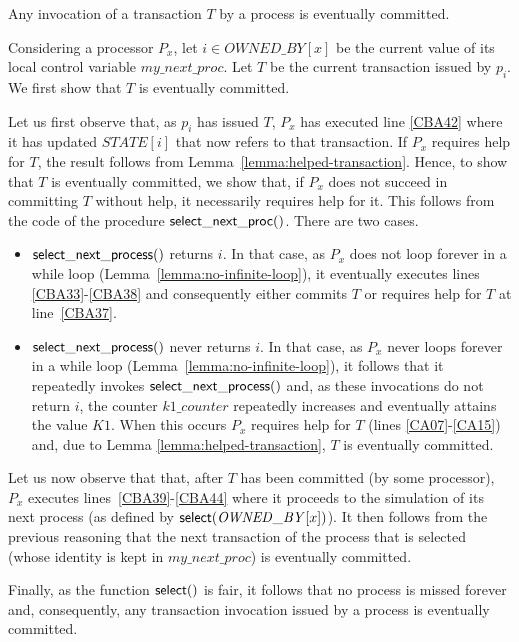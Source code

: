\begin{lemma}
\label{lemma:transactions-are-committed}
Any invocation of a transaction $T$ by a process  is eventually committed.
\end{lemma}

\begin{proofL} 
Considering  a processor $P_x$,   let $i\in \mathit{OWNED\_BY}[x]$ be 
the current value of its local control variable $my\_next\_proc$.  
Let $T$ be the current transaction issued by $p_i$. 
We first show that $T$ is eventually committed.

Let us first observe that, as $p_i$ has issued $T$, $P_x$ has 
executed line \ref{CBA42} 
where it has updated $\mathit{STATE}[i]$ that now refers to that transaction. 
If  $P_x$  requires help for $T$, the result  follows  from 
Lemma~\ref{lemma:helped-transaction}. 
 Hence,  to show that $T$ is eventually committed, we show that, if  $P_x$
does not  succeed in committing  $T$ without help, it necessarily  requires
help for it.  This  follows from the code of the procedure 
${\sf select\_next\_proc}()$. There are two cases. 
\begin{itemize}
\item
${\sf select\_next\_process}()$ returns $i$. 
In that  case, as $P_x$ does not loop forever in a while loop
(Lemma~\ref{lemma:no-infinite-loop}), it eventually executes lines 
\ref{CBA33}-\ref{CBA38} and consequently either commits $T$ or
 requires help for $T$ 
at line~\ref{CBA37}. 
%
\item ${\sf select\_next\_process}()$ never returns $i$. 
In that case, as $P_x$ never loops forever in a  while loop 
(Lemma~\ref{lemma:no-infinite-loop}), it follows that 
it repeatedly invokes ${\sf select\_next\_process}()$ and, 
as these invocations do not return $i$, the counter $k1\_counter$ 
repeatedly increases and eventually attains the value $K1$. When 
this occurs $P_x$ requires help for $T$ (lines \ref{CA07}-\ref{CA15}) 
and, due to Lemma \ref{lemma:helped-transaction}, $T$ is eventually committed. 
\end{itemize}


Let  us  now  observe that  that, after  $T$  has been committed  (by  some
processor), $P_x$ executes lines~\ref{CBA39}-\ref{CBA44}  where  it
proceeds to the  simulation of its next process  (as defined by 
${\sf select}(\mathit{OWNED\_BY}[x])$).  It then  follows 
from the previous reasoning  that  the next transaction of the  process 
that is selected (whose identity is kept in $my\_next\_proc$) 
is eventually committed. 

Finally, as the function ${\sf select}()$ is  fair,  it follows that 
no  process  is  missed  forever and, consequently, any transaction 
invocation  issued by a process is eventually committed. 
\renewcommand{\toto}{lemma:transactions-are-committed}
\end{proofL}




